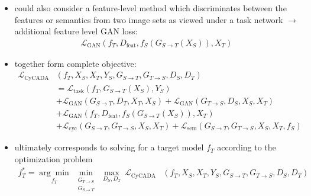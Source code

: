 \begin{itemize}
	\item could also consider a feature-level method which discriminates between the features or semantics from two image sets as viewed under a task network $\rightarrow$ additional feature level GAN loss:
	\begin{align}
		\mathcal{L}_{\text{GAN}}(f_T, D_{\text{feat}}, f_S(G_{S\rightarrow T}(X_S)), X_T)
	\end{align}
	\item together form complete objective:
	\begin{align}
		\mathcal{L}_{\text{CyCADA}}&(f_T, X_S, X_T, Y_S, G_{S\rightarrow T}, G_{T\rightarrow S}, D_S, D_T)\\
		&= \mathcal{L}_{\text{task}}(f_T, G_{S\rightarrow T}(X_S), Y_S)\\
		&+ \mathcal{L}_{\text{GAN}}(G_{S\rightarrow T}, D_T, X_T, X_S) + \mathcal{L}_{\text{GAN}}(G_{T\rightarrow S}, D_S, X_S, X_T)\\
		&+ \mathcal{L}_{\text{GAN}}(f_T, D_{\text{feat}}, f_S(G_{S\rightarrow T}(X_S)), X_T)\\
		&+ \mathcal{L}_{\text{cyc}}(G_{S\rightarrow T}, G_{T\rightarrow S}, X_S, X_T) + \mathcal{L}_{\text{sem}}(G_{S\rightarrow T}, G_{T\rightarrow S}, X_S, X_T, f_S)
	\end{align}
	\item ultimately corresponds to solving for a target model $f_T$ according to the optimization problem
	\begin{align}
		f^*_T = \underset{f_T}{\arg\min} ~ \underset{\substack{G_{T\rightarrow S} \\ G_{S\rightarrow T}}}{\min} ~ \underset{D_S, D_T}{\max} ~ \mathcal{L}_{\text{CyCADA}}&(f_T, X_S, X_T, Y_S, G_{S\rightarrow T}, G_{T\rightarrow S}, D_S, D_T)
	\end{align}
\end{itemize}
